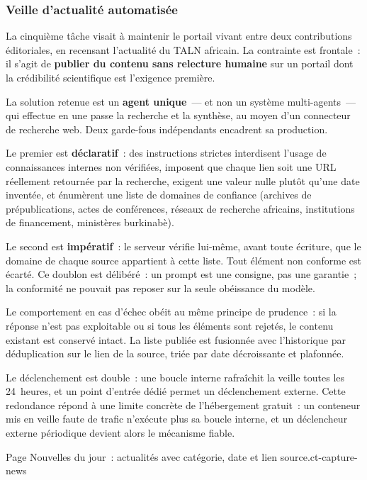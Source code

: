 \subsubsection{Veille d'actualité automatisée}
\label{ssec:ct-news}

La cinquième tâche visait à maintenir le portail vivant entre deux contributions
éditoriales, en recensant l'actualité du TALN africain. La contrainte est frontale~:
il s'agit de \textbf{publier du contenu sans relecture humaine} sur un portail dont la
crédibilité scientifique est l'exigence première.

La solution retenue est un \textbf{agent unique}~--- et non un système multi-agents~---
qui effectue en une passe la recherche et la synthèse, au moyen d'un connecteur de
recherche web. Deux garde-fous indépendants encadrent sa production.

Le premier est \textbf{déclaratif}~: des instructions strictes interdisent l'usage de
connaissances internes non vérifiées, imposent que chaque lien soit une URL réellement
retournée par la recherche, exigent une valeur nulle plutôt qu'une date inventée, et
énumèrent une liste de domaines de confiance (archives de prépublications, actes de
conférences, réseaux de recherche africains, institutions de financement, ministères
burkinabè).

Le second est \textbf{impératif}~: le serveur vérifie lui-même, avant toute écriture,
que le domaine de chaque source appartient à cette liste. Tout élément non conforme
est écarté. Ce doublon est délibéré~: un prompt est une consigne, pas une garantie~;
la conformité ne pouvait pas reposer sur la seule obéissance du modèle.

Le comportement en cas d'échec obéit au même principe de prudence~: si la réponse
n'est pas exploitable ou si tous les éléments sont rejetés, le contenu existant est
conservé intact. La liste publiée est fusionnée avec l'historique par déduplication
sur le lien de la source, triée par date décroissante et plafonnée.

Le déclenchement est double~: une boucle interne rafraîchit la veille toutes les
24~heures, et un point d'entrée dédié permet un déclenchement externe. Cette
redondance répond à une limite concrète de l'hébergement gratuit~: un conteneur mis en
veille faute de trafic n'exécute plus sa boucle interne, et un déclencheur externe
périodique devient alors le mécanisme fiable.

{Page \og{}Nouvelles du jour\fg{}~: actualités avec catégorie, date et lien
	source.}{ct-capture-news}

